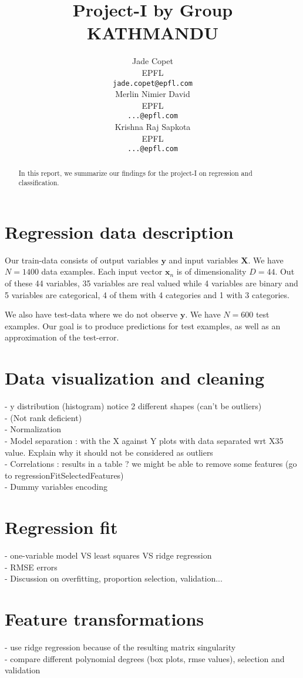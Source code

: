 \documentclass{article} %
\title{Project-I by Group KATHMANDU}
\author{
Jade Copet\\
EPFL \\
\texttt{jade.copet@epfl.com} \\
\And
Merlin Nimier David\\
EPFL \\
\texttt{...@epfl.com} \\
\And
Krishna Raj Sapkota\\
EPFL \\
\texttt{...@epfl.com} \\
}
\begin{document}
\maketitle

\begin{abstract}
In this report, we summarize our findings for the project-I on regression and classification.
\end{abstract}

\section{Regression data description}
Our train-data consists of output variables $\mathbf{y}$ and input variables $\mathbf{X}$. We have $N=1400$ data examples. Each input vector $\mathbf{x}_n$ is of dimensionality $D=44$. Out of these 44 variables, 35 variables are real valued while 4 variables are binary and 5 variables are categorical, 4 of them with 4 categories and 1 with 3 categories.

We also have test-data where we do not observe $\mathbf{y}$. We have $N=600$ test examples. Our goal is to produce predictions for test examples, as well as an approximation of the test-error.

\section{Data visualization and cleaning}
- y distribution (histogram) notice 2 different shapes (can't be outliers)\\
- (Not rank deficient)\\
- Normalization\\
- Model separation : with the X against Y plots with data separated wrt X35 value. Explain why it should not be considered as outliers \\
- Correlations : results in a table ? we might be able to remove some features (go to regressionFitSelectedFeatures)\\
- Dummy variables encoding

\section{Regression fit}
- one-variable model VS least squares VS ridge regression\\
- RMSE errors\\
- Discussion on overfitting, proportion selection, validation...

\section{Feature transformations}
- use ridge regression because of the resulting matrix singularity\\
- compare different polynomial degrees (box plots, rmse values), selection and validation
\end{document}
